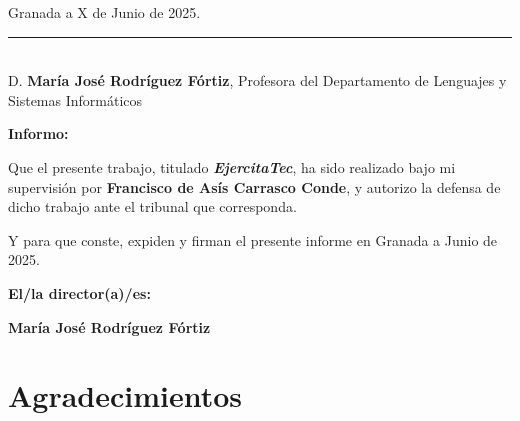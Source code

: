 \vspace{2cm}

\begin{flushright}
Granada a X de Junio de 2025.
\end{flushright}

\cleardoublepage

\thispagestyle{empty}

\noindent\rule[-1ex]{\textwidth}{2pt}\\[4.5ex]

D. \textbf{María José Rodríguez Fórtiz}, Profesora del Departamento de Lenguajes y Sistemas Informáticos

\vspace{0.5cm}

\textbf{Informo:}

\vspace{0.5cm}

Que el presente trabajo, titulado \textit{\textbf{EjercitaTec}},
ha sido realizado bajo mi supervisión por \textbf{Francisco de Asís Carrasco Conde}, y autorizo la defensa de dicho trabajo ante el tribunal
que corresponda.

\vspace{0.5cm}

Y para que conste, expiden y firman el presente informe en Granada a Junio de 2025.

\vspace{1cm}

\textbf{El/la director(a)/es: }

\vspace{5cm}

\noindent \textbf{María José Rodríguez Fórtiz}

\chapter*{Agradecimientos}




